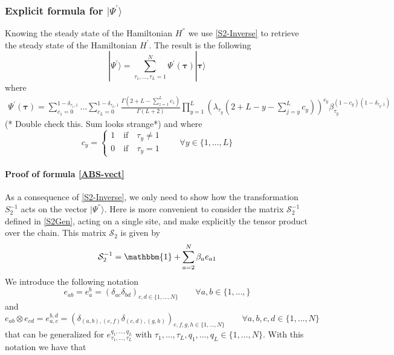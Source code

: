 \documentclass[11pt]{article}
\numberwithin{equation}{section}
\numberwithin{equation}{subsection}
\newcommand{\com}[1]{{ (* {\color{red}\small #1}*)}}
\begin{document}
\subsubsection{Explicit formula for $|\Psi^{'}\rangle$}\label{subsectionSSdual}
Knowing the steady state  of the Hamiltonian $H^{''}$ we use \eqref{S2-Inverse} to retrieve the steady state of the Hamiltonian $H^{'}$. The result is the following 
\begin{equation}\label{ABS-vect}
    |\Psi^{'}\rangle =\sum_{\tau_{1},\ldots,\tau_{L}=1}^{N}\Psi^{'}(\bm{\tau})|\bm{\tau}\rangle 
\end{equation}
where  
\begin{equation}\label{ABS}
		\begin{split}
			\Psi^{'}(\bm{\tau})=\sum_{c_{1}=0}^{1-\delta_{\tau_{1},1}}\ldots\sum_{c_{L}=0}^{1-\delta_{\tau_{L},1}}\frac{\Gamma(2+L-\sum_{z=1}^{L}c_{z})}{\Gamma(L+2)}\prod_{y=1}^{L}\left(\lambda_{\tau_{y}}\left(2+L-y-\sum_{j=y}^{L}c_{y}\right)\right)^{c_{y}}\beta_{\tau_{y}}^{(1-c_{y})(1-\delta_{\tau_{y},1})}
		\end{split}
	\end{equation} 
	\com{Double check this. Sum looks strange}
and where
 \begin{equation}\label{CiEquation}
	c_{y}=\begin{cases}
		1\quad \text{if}\quad \tau_{y}\neq 1\\
		0\quad \text{if}\quad \tau_{y}=1
	\end{cases}\qquad \forall y\in \{1,\ldots,L\}
\end{equation}
\paragraph{Proof of formula \eqref{ABS-vect}} As a consequence of \eqref{S2-Inverse}, we only need to show how the transformation $S_{2}^{-1}$ acts on the vector $|\Psi^{''}\rangle$. Here is more convenient to consider the matrix $\mathcal{S}_{2}^{-1}$ defined in \eqref{S2Gen}, acting on a single site, and make explicitly the tensor product over the chain. This matrix $\mathcal{S}_{2}$ is given by 
\begin{equation}
   \mathcal{S}_{2}^{-1}=\mathbbm{1}+\sum_{a=2}^{N}\beta_{a}e_{a1}
\end{equation}
We introduce the following notation
\begin{equation}\label{notation1}
    e_{ab}=e_{a}^{b}=\left(\delta_{ac}\delta_{bd}\right)_{c,d\in\{1,\ldots,N\}}\qquad \forall a,b\in \{1,\ldots,\}
\end{equation}
and 
\begin{equation}\label{notation2}
    e_{ab}\otimes e_{cd}=e_{a,c}^{b,d}=\left(\delta_{(a,b),(e,f)}\delta_{(c,d),(g,h)}\right)_{e,f,g,h\in \{1,\ldots,N\}}\qquad \forall a,b,c,d\in \{1,\ldots,N\}
    \end{equation}
    that can be generalized for $e_{\tau_{1},\ldots,\tau_{L}}^{q_{1},\ldots,q_{L}}$ with $\tau_{1},\ldots,\tau_{L},q_{1},\ldots,q_{L}\in \{1,\ldots,N\}$. With this notation we have that
    
\end{document}
